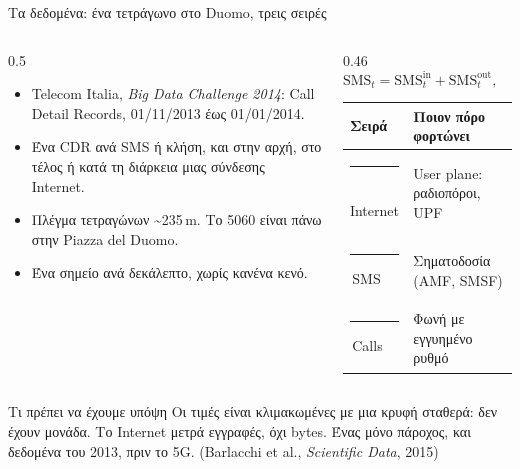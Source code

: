 \documentclass[aspectratio=169,10pt]{beamer}
\newcommand{\muted}[1]{\textcolor{muted}{#1}}
\newcommand{\ser}[2]{\textcolor{#1}{\rule[0.05em]{0.6em}{0.6em}}\,#2}
\newcommand{\sInet}{\ser{inet}{Internet}}
\newcommand{\sSms}{\ser{sms}{SMS}}
\newcommand{\sCalls}{\ser{calls}{Calls}}
\begin{document}
\begin{frame}{Τα δεδομένα: ένα τετράγωνο στο Duomo, τρεις σειρές}
  \begin{columns}[T, onlytextwidth]
    \begin{column}{0.5\textwidth}
      \small
      \begin{itemize}
        \item Telecom Italia, \emph{Big Data Challenge 2014}: Call Detail Records, 01/11/2013 έως 01/01/2014.
        \item Ένα CDR ανά SMS ή κλήση, και στην αρχή, στο τέλος ή κατά τη διάρκεια μιας σύνδεσης Internet.
        \item Πλέγμα τετραγώνων \textasciitilde 235\,m. Το \alert{5060} είναι πάνω στην Piazza del Duomo.
        \item Ένα σημείο ανά δεκάλεπτο, \alert{χωρίς κανένα κενό}.
      \end{itemize}
    \end{column}
    \begin{column}{0.46\textwidth}
      \small
      \[
        \text{SMS}_t = \text{SMS}^{\text{in}}_t + \text{SMS}^{\text{out}}_t, \qquad
        \text{Calls}_t = \text{Call}^{\text{in}}_t + \text{Call}^{\text{out}}_t
      \]
      \vspace{-0.4em}
      \begin{tabular}{@{}ll@{}}
        \toprule
        Σειρά & Ποιον πόρο φορτώνει \\
        \midrule
        \sInet & User plane: ραδιοπόροι, UPF \\
        \sSms & Σηματοδοσία (AMF, SMSF) \\
        \sCalls & Φωνή με εγγυημένο ρυθμό \\
        \bottomrule
      \end{tabular}
    \end{column}
  \end{columns}
  \vspace{0.5em}
  \begin{block}{Τι πρέπει να έχουμε υπόψη}
    \small Οι τιμές είναι κλιμακωμένες με μια κρυφή σταθερά: \alert{δεν έχουν μονάδα}. Το Internet μετρά εγγραφές, όχι bytes. Ένας μόνο πάροχος, και δεδομένα του 2013, πριν το 5G. \muted{(Barlacchi et al., \emph{Scientific Data}, 2015)}
  \end{block}
\end{frame}
\end{document}

